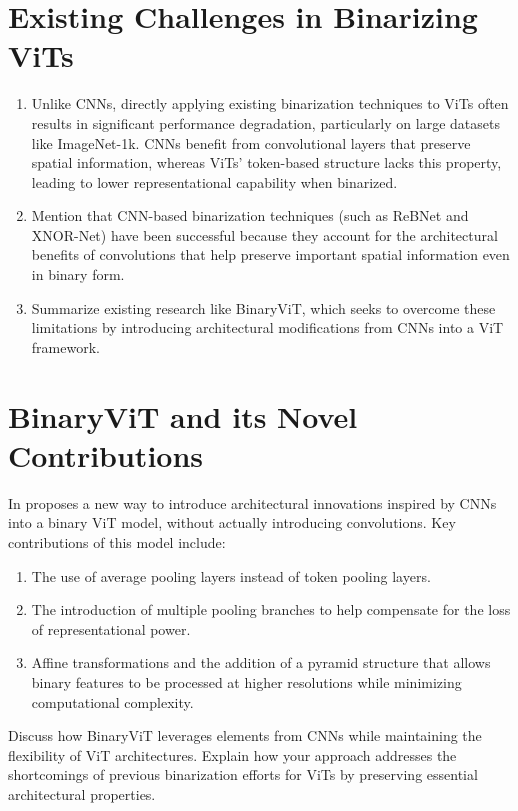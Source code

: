 \documentclass{report}
\begin{document}
	
	\section{Existing Challenges in Binarizing ViTs}
	\begin{enumerate}
		\item
		Unlike CNNs, directly applying existing binarization techniques to ViTs often results in significant performance degradation, particularly on large datasets like ImageNet-1k. CNNs benefit from convolutional layers that preserve spatial information, whereas ViTs' token-based structure lacks this property, leading to lower representational capability when binarized.
		
		\item 
		Mention that CNN-based binarization techniques (such as ReBNet and XNOR-Net) have been successful because they account for the architectural benefits of convolutions that help preserve important spatial information even in binary form.
		
		\item 
		Summarize existing research like BinaryViT, which seeks to overcome these limitations by introducing architectural modifications from CNNs into a ViT framework.
	\end{enumerate}
	
	
	\section{BinaryViT and its Novel Contributions}
	In \cite{le2023binaryvit} proposes a new way to introduce architectural innovations inspired by CNNs into a binary ViT model, without actually introducing convolutions. Key contributions of this model include:
	\begin{enumerate}
		\item 
		The use of average pooling layers instead of token pooling layers.
		
		\item 
		The introduction of multiple pooling branches to help compensate for the loss of representational power.
		
		\item 
		Affine transformations and the addition of a pyramid structure that allows binary features to be processed at higher resolutions while minimizing computational complexity.
	\end{enumerate}
	
	Discuss how BinaryViT leverages elements from CNNs while maintaining the flexibility of ViT architectures. Explain how your approach addresses the shortcomings of previous binarization efforts for ViTs by preserving essential architectural properties.
	
	
	
	
	
	
	
	
	
	
	
	\newpage
	
	
\end{document}
